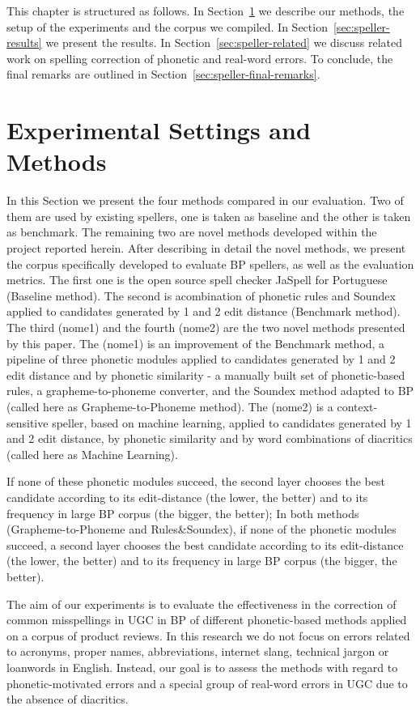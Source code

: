 This chapter is structured as follows. In Section~\ref{sec:speller-method} we describe our methods, the setup of the experiments and the corpus we compiled. In Section~\ref{sec:speller-results} we present the results. In Section~\ref{sec:speller-related} we discuss related work on spelling correction of phonetic and real-word errors. To conclude, the final remarks are outlined in Section~\ref{sec:speller-final-remarks}.

\section{Experimental Settings and Methods}\label{sec:speller-method}

In this Section we present the four methods compared in our evaluation. Two of them are used by existing spellers, one is taken as baseline and the other is taken as benchmark. The remaining two are novel methods developed within the project reported herein. After describing in detail the novel methods, we present the corpus specifically developed to evaluate BP spellers, as well as the evaluation metrics.
The first one is the open source spell checker JaSpell for Portuguese (Baseline method). The second is acombination of phonetic rules and Soundex applied to candidates generated by 1 and 2 edit distance (Benchmark method). The third (nome1) and the fourth (nome2) are the two novel methods presented by this paper. The (nome1) is an improvement of the Benchmark method, a pipeline of three phonetic modules applied to candidates generated by 1 and 2 edit distance and by phonetic similarity - a manually built set of phonetic-based rules, a grapheme-to-phoneme converter, and the Soundex method adapted to BP (called here as Grapheme-to-Phoneme method). The (nome2) is a context-sensitive speller, based on machine learning, applied to candidates generated by 1 and 2 edit distance, by phonetic similarity and by word combinations of diacritics (called here as Machine Learning).
 
If none of these phonetic modules succeed, the second layer chooses the best candidate according to its edit-distance (the lower, the better) and to its frequency in large BP corpus (the bigger, the better); 
In both methods (Grapheme-to-Phoneme and Rules\&Soundex), if none of the phonetic modules succeed, a second layer chooses the best candidate according to its edit-distance (the lower, the better) and to its frequency in large BP corpus (the bigger, the better).

The aim of our experiments is to evaluate the effectiveness in the correction of common misspellings in UGC in BP of different phonetic-based methods applied on a corpus of product reviews. In this research we do not focus on errors related to acronyms, proper names, abbreviations, internet slang, technical jargon or loanwords in English. Instead, our goal is to assess the methods with regard to  phonetic-motivated errors and a special group of real-word errors in UGC due to the absence of diacritics.

